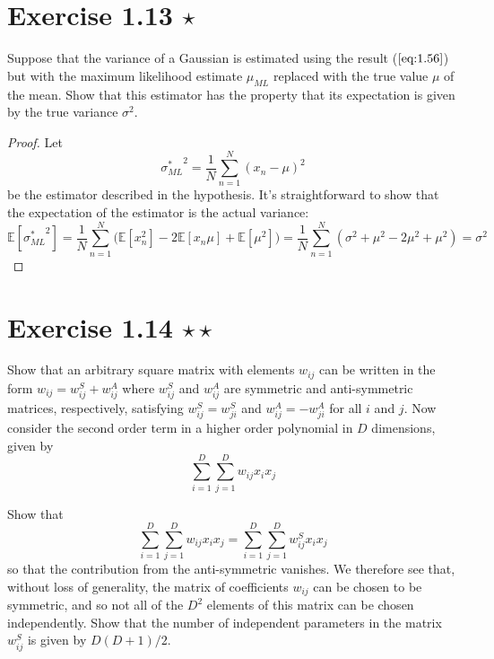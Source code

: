 \section*{Exercise 1.13 $\star$}
Suppose that the variance of a Gaussian is estimated using the result ($\ref{eq:1.56}$) but
with the maximum likelihood estimate $\mu_{ML}$ replaced with the true value $\mu$ of
the mean. Show that this estimator has the property that its expectation is given by the
true variance $\sigma^2$.

\vspace{1em}

\begin{proof}
Let 
 \[
     {\sigma_{ML}^*}^2 = \frac{1}{N} \sum_{n=1}^{N} (x_n - \mu)^2
\] 
be the estimator described in the hypothesis. It's straightforward to show that the
expectation of the estimator is the actual variance:
\[
    \mathbb{E}[{\sigma_{ML}^*}^2] = \frac{1}{N} \sum_{n=1}^{N} 
        \bigg(\mathbb{E}[x_n^2] - 2\mathbb{E}[x_n \mu] + \mathbb{E}[\mu^2]\bigg)
        =\frac{1}{N} \sum_{n=1}^{N} (\sigma^2 + \mu^2 - 2\mu^2 + \mu^2) = \sigma^2
\] 
\end{proof}

\section*{Exercise 1.14 $\star \star$} Show that an arbitrary square matrix with elements $w_{ij}$ can
be written in the form $w_{ij} = w_{ij}^S + w_{ij}^A$ where $w_{ij}^S$ and $w_{ij}^A$ are
symmetric and anti-symmetric matrices, respectively, satisfying $w_{ij}^S = w_{ji}^S$ and
$w_{ij}^A = -w_{ji}^A$ for all $i$ and $j$. Now consider the second order term in a higher
order polynomial in $D$ dimensions, given by
\begin{equation}\label{eq:1.131}\tag{1.131}
    \sum_{i=1}^{D} \sum_{j=1}^{D} w_{ij}x_ix_j
\end{equation}

Show that 
\begin{equation}\label{eq:1.132}\tag{1.132}
    \sum_{i=1}^{D} \sum_{j=1}^{D} w_{ij}x_ix_j = \sum_{i=1}^{D} \sum_{j=1}^{D} w_{ij}^S x_ix_j
\end{equation}
so that the contribution from the anti-symmetric vanishes. We therefore see
that, without loss of generality, the matrix of coefficients $w_{ij}$ can be chosen
to be symmetric, and so not all of the $D^2$ elements of this matrix can be chosen
independently. Show that the number of independent parameters in the matrix $w_{ij}^S$
is given by  $D(D+1)/2$.

